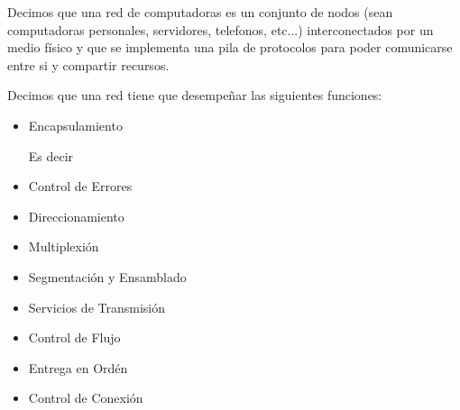 \documentclass[12pt, fleqn]{report}                             %
\theoremstyle{break}                                            %
\begin{document}
                Decimos que una red de computadoras es un conjunto de nodos (sean computadoras personales, 
                servidores, telefonos, etc...) interconectados por un medio físico y que se implementa
                una pila de protocolos para poder comunicarse entre si y compartir recursos.

                Decimos que una red tiene que desempeñar las siguientes funciones:
                \begin{itemize}
                    \item Encapsulamiento

                        Es decir 
                    \item Control de Errores
                    \item Direccionamiento
                    \item Multiplexión
                    \item Segmentación y Ensamblado
                    \item Servicios de Transmisión
                    \item Control de Flujo
                    \item Entrega en Ordén
                    \item Control de Conexión
                \end{itemize}


        \clearpage
\end{document}
